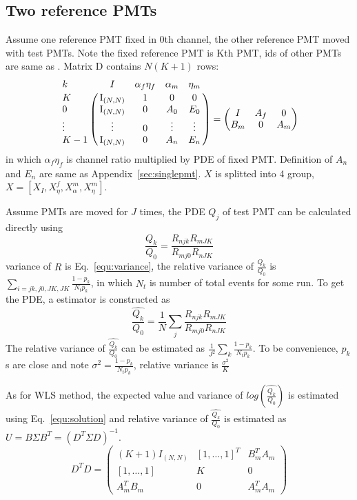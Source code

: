 \subsection{Two reference PMTs}
Assume one reference PMT fixed in 0th channel, the other reference PMT moved with test PMTs. Note the fixed reference PMT is Kth PMT, ids of other PMTs are same as . Matrix D contains $N(K+1)$ rows:
\begin{equation}
    \bordermatrix{
        k&I&\alpha_f\eta_f&\alpha_m&\eta_m\cr
        K&\mathrm{I}_{(N,N)}&1&0&0\cr
        0&\mathrm{I}_{(N,N)}&0&A_{0}&E_{0}\cr
        \vdots&\vdots&0&\vdots&\vdots\cr
        K-1&\mathrm{I}_{(N,N)}&0&A_{n}&E_{n}
    }=\begin{pmatrix}
        I&A_f&0\\
        B_m&0&A_m
    \end{pmatrix}
\end{equation}
in which $\alpha_f\eta_f$ is channel ratio multiplied by PDE of fixed PMT. Definition of $A_n$ and $E_n$ are same as Appendix~\ref{sec:singlepmt}. $X$ is splitted into 4 group, $X=[X_I,X^f_\eta,X^m_\alpha,X^m_\eta]$.

Assume PMTs are moved for $J$ times, the PDE $Q_j$ of test PMT can be calculated directly using
\begin{equation}
    \frac{Q_k}{Q_0} = \frac{R_{njk}R_{mJK}}{R_{mj0}R_{nJK}}
\end{equation}
variance of $R$ is Eq.~\eqref{equ:variance}, the relative variance of $\frac{Q_k}{Q_0}$ is $\sum_{i=jk,j0,JK,JK}{\frac{1-p_k}{N_tp_k}}$, in which $N_t$ is number of total events for some run. To get the PDE, a estimator is constructed as 
\begin{equation}
    \hat{\frac{Q_k}{Q_0}}=\frac{1}{N}\sum_j{\frac{R_{njk}R_{mJK}}{R_{mj0}R_{nJK}}}
\end{equation}
The relative variance of $\hat{\frac{Q_k}{Q_0}}$ can be estimated as $\frac{1}{J^2}\sum_k{\frac{1-p_k}{N_tp_k}}$. To be convenience, $p_k$s are close and note $\sigma^2=\frac{1-p_k}{N_tp_k}$, relative variance is $\frac{\sigma^2}{K}$

As for WLS method, the expected value and variance of $log(\hat{\frac{Q_k}{Q_0}})$ is estimated using Eq.~\eqref{equ:solution} and relative variance of $\hat{\frac{Q_k}{Q_0}}$ is estimated as $U=B\Sigma B^T=(D^T\Sigma D)^{-1}$.
\begin{equation}
    D^TD=\begin{pmatrix}
        (K+1)I_{(N,N)} &[1,\dots,1]^T&B_m^TA_m\\
        [1,\dots,1]&K&0\\
        A_m^TB_m&0&A_m^TA_m
    \end{pmatrix}
\end{equation}

